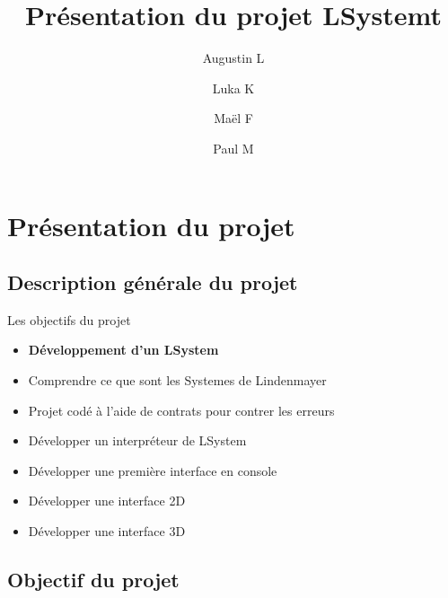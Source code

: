 \documentclass{beamer}
\title{Présentation du projet LSystemt}
\author{Augustin L\\ \and Luka K\\ \and Maël F\\ \and Paul M}
\institute{Université de Caen Normandie\\
L2 Info\\ Groupe 4B}
\begin{document}
\begin{frame}
\titlepage
\end{frame}


\begin{frame}
\tableofcontents
\end{frame}


\section{Présentation du projet}

\subsection{Description générale du projet}

\begin{frame}

\begin{block}{Les objectifs du projet}
	\begin{itemize}
		\item \textbf{Développement d'un LSystem}
		\item Comprendre ce que sont les Systemes de Lindenmayer
		\item Projet codé à l'aide de contrats pour contrer les erreurs
		\item Développer un interpréteur de LSystem
		\item Développer une première interface en console
		\item Développer une interface 2D
		\item Développer une interface 3D
	\end{itemize}
\end{block}

\end{frame}



\subsection{Objectif du projet}
\end{document}
